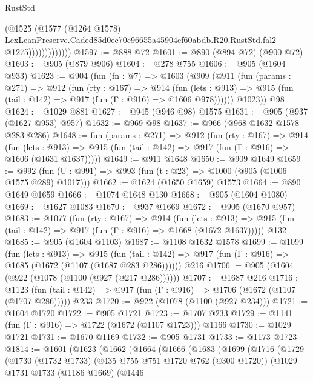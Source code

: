 \begin{lexlean}{RustStd}
\begin{coremodule}
                          (@1525
                            (@1577
                              (@1264 @1578)
                              LexLeanPreserve.Caded85d0ec70c96655a45904ef60abdb.R20.RustStd.fal2
                              @1275)))))))))))))
@1597 := @888 @72
@1601 := @890 (@894 @72) (@900 @72)
@1603 := @905 (@879 @906)
@1604 := @278 @755
@1606 := @905 (@1604 @933)
@1623 := @904
    (fun (fn : @7) =>
    @1603
      (@909
        (@911
          (fun (params : @271) =>
          @912
            (fun (rty : @167) =>
            @914
              (fun (lets : @913) =>
              @915 (fun (tail : @142) => @917 (fun (Γ : @916) => @1606 @978))))))
        @1023))
    @98
@1624 := @1029 @881
@1627 := @945 (@946 @98) @1575
@1631 := @905 (@937 (@1627 @953) @957)
@1632 := @969 @98
@1637 := @966 (@968 @1632 @1578 @283 @286)
@1648 := fun (params : @271) =>
  @912
    (fun (rty : @167) =>
    @914
      (fun (lets : @913) =>
      @915 (fun (tail : @142) => @917 (fun (Γ : @916) => @1606 (@1631 @1637)))))
@1649 := @911 @1648
@1650 := @909 @1649
@1659 := @992 (fun (U : @991) => @993 (fun (t : @23) => @1000 (@905 (@1006 @1575 @289) @1017)))
@1662 := @1624 (@1650 @1659) @1573
@1664 := @890 @1649 @1659
@1666 := @1074 @1648 @130
@1668 := @905 (@1604 @1080)
@1669 := @1627 @1083
@1670 := @937 @1669
@1672 := @905 (@1670 @957)
@1683 := @1077
    (fun (rty : @167) =>
    @914
      (fun (lets : @913) =>
      @915 (fun (tail : @142) => @917 (fun (Γ : @916) => @1668 (@1672 @1637)))))
    @132
@1685 := @905 (@1604 @1103)
@1687 := @1108 @1632 @1578
@1699 := @1099
    (fun (lets : @913) =>
    @915 (fun (tail : @142) => @917 (fun (Γ : @916) => @1685 (@1672 (@1107 (@1687 @283 @286))))))
    @216
@1706 := @905 (@1604 (@922 (@1078 (@1100 (@927 (@217 @286))))))
@1707 := @1687 @216
@1716 := @1123
    (fun (tail : @142) => @917 (fun (Γ : @916) => @1706 (@1672 (@1107 (@1707 @286)))))
    @233
@1720 := @922 (@1078 (@1100 (@927 @234)))
@1721 := @1604 @1720
@1722 := @905 @1721
@1723 := @1707 @233
@1729 := @1141 (fun (Γ : @916) => @1722 (@1672 (@1107 @1723))) @1166
@1730 := @1029 @1721
@1731 := @1670 @1169
@1732 := @905 @1731
@1733 := @1173 @1723
@1814 := @1601
    (@1623
      (@1662
        (@1664
          (@1666
            (@1683
              (@1699
                (@1716
                  (@1729
                    (@1730
                      (@1732 @1733)
                      (@435 @755 @751 @1720 @762 (@300 @1720))
                      (@1029
                        @1731
                        @1733
                        (@1186 @1669)
                        (@1446

\end{coremodule}
\end{lexlean}
